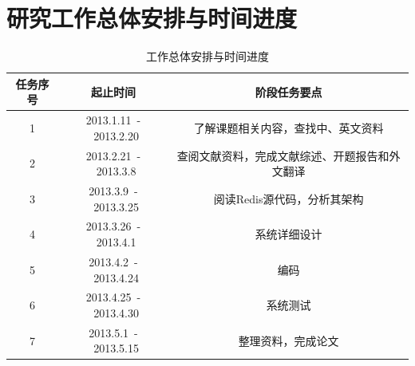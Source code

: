 \documentclass[proposal]{zjutreport}
\begin{document}
\chapter{研究工作总体安排与时间进度}
\begin{table}[htbp]
\caption{工作总体安排与时间进度}\label{tab:table1}
\vspace{0.5em}
\begin{center}
{\wuhao
\begin{tabular}{|c|c|c|}
\hline
任务序号 & 起止时间 & 阶段任务要点\\ \hline
1 & 2013.1.11~-~2013.2.20 & 了解课题相关内容，查找中、英文资料\\ \hline
2 & 2013.2.21~-~2013.3.8 & 查阅文献资料，完成文献综述、开题报告和外文翻译\\ \hline
3 & 2013.3.9~-~2013.3.25 & 阅读Redis源代码，分析其架构\\ \hline
4 & 2013.3.26~-~2013.4.1 & 系统详细设计\\ \hline
5 & 2013.4.2~-~2013.4.24 & 编码\\ \hline
6 & 2013.4.25~-~2013.4.30 & 系统测试\\ \hline
7 & 2013.5.1~-~2013.5.15 & 整理资料，完成论文\\ \hline
\end{tabular}}
\end{center}
\vspace{\baselineskip}
\end{table}

\backmatter
\endgroup %
\clearpage %

\nocite{*}                                   %

\end{document}
